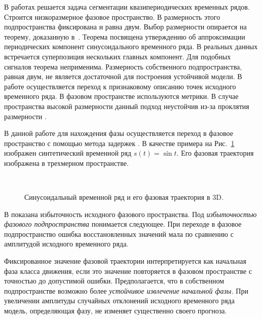 \documentclass[12pt, twoside]{article}
\theoremstyle{definition}
\begin{document}
В работах \cite{motrenko2015extracting, ignatov2016human, grabovoy2020quasi} решается задача сегментации квазипериодических временных рядов. Строится низкоразмерное фазовое пространство.
В \cite{motrenko2015extracting, grabovoy2020quasi} размерность этого подпространства фиксирована и равна двум.
Выбор размерности опирается на теорему, доказанную в~\cite{motrenko2015extracting}. Теорема посвящена утверждению об аппроксимации периодических компонент синусоидального временного ряда. %
В реальных данных встречается суперпозиция нескольких главных компонент. Для подобных сигналов теорема неприменима.
Размерность собственного подпространства, равная двум, не является достаточной для построения устойчивой модели.
В работе \cite{ignatov2016human} осуществляется переход к признаковому описанию точек исходного временного ряда. В фазовом пространстве используются метрики.
В случае пространства высокой размерности данный подход неустойчив из-за проклятия размерности \cite{bellman1957dynamic, bellman1961adaptive, beyer1999nearest, powell2007approximate}. 

В данной работе для нахождения фазы осуществляется переход в фазовое пространство с помощью метода задержек \cite{lukyanov, maltsev}. В качестве примера на Рис.~\ref{fg:initial_traj} изображен синтетический временной ряд $s(t) = \sin t$. Его фазовая траектория изображена в трехмерном пространстве. 

\begin{figure}[ht]
\centering
  \\
\caption{Синусоидальный временной ряд и его фазовая траектория в 3D. }
\label{fg:initial_traj}
\end{figure}
 
В \cite{motrenko2015extracting, grabovoy2020quasi, usmanova} показана избыточность исходного фазового пространства. Под \emph{избыточностью фазового подпространства} понимается следующее. При переходе в фазовое подпространство ошибка восстановленных значений мала по сравнению с амплитудой исходного временного ряда.

Фиксированное значение фазовой траектории интерпретируется как начальная фаза класса движения, если это значение повторяется в фазовом пространстве с точностью до допустимой ошибки. 
Предполагается, что в собственном подпространстве возможно более \emph{устойчивое извлечение начальной фазы.}
При увеличении амплитуды случайных отклонений исходного временного ряда модель, определяющая фазу, не изменяет существенно своего прогноза.   
\end{document}
